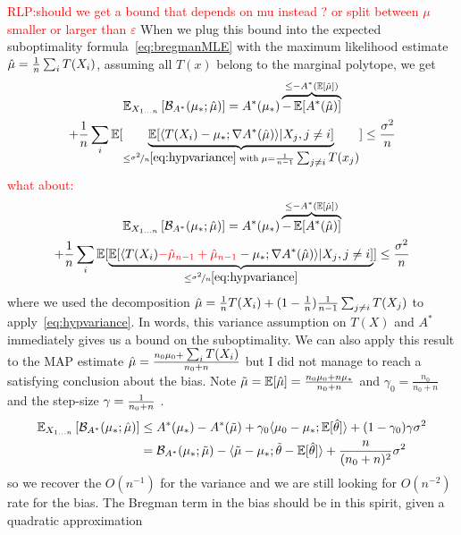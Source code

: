 \documentclass{article}
\newcommand{\RLP}[1]{\textcolor{red}{RLP:#1}}
\newcommand*{\expect}[2][]{\ensuremath{\mathbb{E}_{#1} \left[ #2 \right] }} %
\newcommand{\logpart}{A}
\newcommand{\conj}{\logpart^*}
\newcommand{\bregmanconj}{\cB_{\logpart^*}}
\newcommand{\natp}{\theta}
\begin{document}
\RLP{should we get a bound that depends on mu instead ? or split between $\mu$ smaller or larger than $\varepsilon$}
When we plug this bound into the expected suboptimality formula~\eqref{eq:bregmanMLE} with the maximum likelihood estimate $\hat \mu =  \frac{1}{n}\sum_i T(X_i)$, assuming all $T(x)$ belong to the marginal polytope, we get
\begin{multline}
	\expect[X_{1\dots n}]{\bregmanconj ( \mu_* ;\hat \mu) }
	=\conj(\mu_*) \overbrace{- \E[\conj(\hat \mu)]}^{\leq - \conj(\E[\hat \mu])} \\
	+ \inv{n}\sum_i \E[\underbrace{\E[\langle  T(X_i) - \mu_*; \nabla\conj (\hat \mu) \rangle | X_j, j\neq i]}_{\leq \nicefrac{\sigma^2}{n} \eqref{eq:hypvariance}
	 	\; \text{with}\; \mu=\inv{n-1}\smallsum_{j\neq i} T(x_j)  } ]  \leq \frac{\sigma^2}{n}
\end{multline}
\textcolor{red}{what about:}
\begin{multline}
	\expect[X_{1\dots n}]{\bregmanconj ( \mu_* ;\hat \mu) }
	=\conj(\mu_*) \overbrace{- \E[\conj(\hat \mu)]}^{\leq - \conj(\E[\hat \mu])} \\
	+ \inv{n}\sum_i \E[\underbrace{\E[\langle  T(X_i) \textcolor{red}{- \hat \mu_{n-1} + \hat \mu_{n-1}} - \mu_*; \nabla\conj (\hat \mu) \rangle | X_j, j\neq i]}_{\leq \nicefrac{\sigma^2}{n} \eqref{eq:hypvariance} } ]  \leq \frac{\sigma^2}{n}
\end{multline}
where we used the decomposition $\hat \mu = \frac{1}{n}T(X_i) + (1-\frac{1}{n}) \frac{1}{n-1} \sum_{j\neq i}T(X_j)$ to apply~\eqref{eq:hypvariance}. 
In words, this variance assumption on $T(X)$ and $\conj$ immediately gives us a bound on the suboptimality. We can also apply this result to the MAP estimate $\hat \mu = \frac{n_0 \mu_0 + \textstyle \sum_i T(X_i)}{n_0+n}$ but I did not manage to reach a satisfying conclusion about the bias. 
Note $\tilde \mu = \operatorname{\mathbb{E}}[\hat \mu] = \frac{n_0 \mu_0 + n \mu_*}{n_0+n}$ and $\gamma_0= \frac{n_0}{n_0+n}$ and the step-size $\gamma = \frac{1}{n_0 + n}$ .
\begin{align}
	\expect[X_{1\dots n}]{\bregmanconj ( \mu_* ;\hat \mu) } 
	&\leq \conj(\mu_*) - \conj(\tilde \mu) + \gamma_0 \langle \mu_0 - \mu_* ; \E[\hat \natp] \rangle + (1 - \gamma_0) \gamma \sigma^2  \\
	& = \bregmanconj (\mu_* ; \tilde \mu) - \langle \tilde \mu - \mu_* ;    \tilde \natp - \E[\hat \natp] \rangle + \frac{n}{(n_0+n)^2}\sigma^2
\end{align}
so we recover the $O(n^{-1})$ for the variance and we are still looking for $O(n^{-2})$ rate for the bias. The Bregman term in the bias should be in this spirit, given a quadratic approximation
\end{document}
